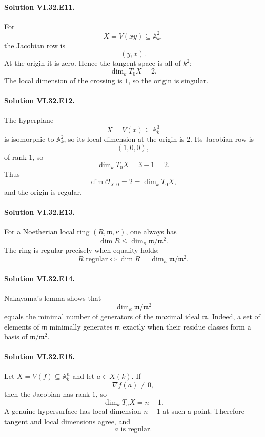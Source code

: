 \paragraph{Solution VI.32.E11.}
For
\[
X=V(xy)\subseteq\mathbb A^2_k,
\]
the Jacobian row is
\[
(y,x).
\]
At the origin it is zero.  Hence the tangent space is all of \(k^2\):
\[
\boxed{\dim_kT_0X=2}.
\]
The local dimension of the crossing is \(1\), so the origin is singular.

\paragraph{Solution VI.32.E12.}
The hyperplane
\[
X=V(x)\subseteq\mathbb A^3_k
\]
is isomorphic to \(\mathbb A^2_k\), so its local dimension at the origin is \(2\).  Its Jacobian row is
\[
(1,0,0),
\]
of rank \(1\), so
\[
\dim_kT_0X=3-1=2.
\]
Thus
\[
\boxed{\dim\mathcal O_{X,0}=2=\dim_kT_0X},
\]
and the origin is regular.

\paragraph{Solution VI.32.E13.}
For a Noetherian local ring \((R,\mathfrak m,\kappa)\), one always has
\[
\dim R\le\dim_\kappa\mathfrak m/\mathfrak m^2.
\]
The ring is regular precisely when equality holds:
\[
\boxed{
R\text{ regular}
\iff
\dim R=\dim_\kappa\mathfrak m/\mathfrak m^2.
}
\]

\paragraph{Solution VI.32.E14.}
Nakayama's lemma shows that
\[
\dim_\kappa\mathfrak m/\mathfrak m^2
\]
equals the minimal number of generators of the maximal ideal \(\mathfrak m\).  Indeed, a set of elements of
\(\mathfrak m\) minimally generates \(\mathfrak m\) exactly when their residue classes form a basis of
\(\mathfrak m/\mathfrak m^2\).

\paragraph{Solution VI.32.E15.}
Let \(X=V(f)\subseteq\mathbb A^n_k\) and let \(a\in X(k)\).  If
\[
\nabla f(a)\ne0,
\]
then the Jacobian has rank \(1\), so
\[
\dim_kT_aX=n-1.
\]
A genuine hypersurface has local dimension \(n-1\) at such a point. Therefore tangent and local dimensions agree,
and
\[
\boxed{a\text{ is regular}.}
\]

